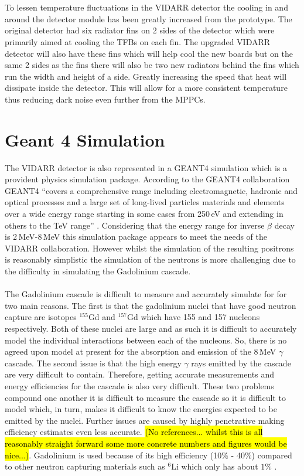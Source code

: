 \documentclass[12pt,a4paper]{article}
\begin{document}
\\\\To lessen temperature fluctuations in the VIDARR detector the cooling in and around the detector module has been greatly increased from the prototype. The original detector had six radiator fins on 2 sides of the detector which were primarily aimed at cooling the TFBs on each fin. The upgraded VIDARR detector will also have these fins which will help cool the new boards but on the same 2 sides as the fins there will also be two new radiators behind the fins which run the width and height of a side. Greatly increasing the speed that heat will dissipate inside the detector. This will allow for a more consistent temperature  thus reducing dark noise even further from the MPPCs. 
\section{Geant 4 Simulation}\label{sec_geant4Simulation} 
The VIDARR detector is also represented in a GEANT4 simulation which is a provident physics simulation package. According to the GEANT4 collaboration GEANT4 ``covers a comprehensive range including electromagnetic, hadronic and optical processes and a large set of long-lived particles materials and elements over a wide energy range starting in some cases from 250\,eV and extending in others to the TeV range'' \cite{Agostinelli:2002hh}. Considering that the energy range for inverse $\beta$ decay is 2\,MeV-8\,MeV \cite{Mueller_2011} this simulation package appears to meet the needs of the VIDARR collaboration. However whilst the simulation of the resulting positrons is reasonably simplistic the simulation of the neutrons is more challenging due to the difficulty in simulating the Gadolinium cascade. 
\\\\The Gadolinium cascade is difficult to measure and accurately simulate for for two main reasons. The first is that the gadolinium nuclei that have good neutron capture are isotopes $^{155}$Gd and $^{157}$Gd which have 155 and 157 nucleons respectively. Both of these nuclei are large and as such it is difficult to accurately model the individual interactions between each of the nucleons. So, there is no agreed upon model at present for the absorption and emission of the 8\,MeV $\gamma$ cascade. The second issue is that the high energy $\gamma$ rays emitted by the cascade are very difficult to contain. Therefore, getting accurate measurements and energy efficiencies for the cascade is also very difficult. These two problems compound one another it is difficult to measure the cascade so it is difficult to model which, in turn, makes it difficult to know the energies expected to be emitted by the nuclei. Further issues are caused by highly penetrative making efficiency estimates even less accurate. \hl{(No references... whilst this is all reasonably straight forward some more concrete numbers and figures would be nice...)}. Gadolinium is used because of its high efficiency (10$\%$ - 40$\%$) compared to other neutron capturing materials such as $^6$Li which only has about $1\%$ \cite{Abdushukurov_2010}. 
\end{document}
